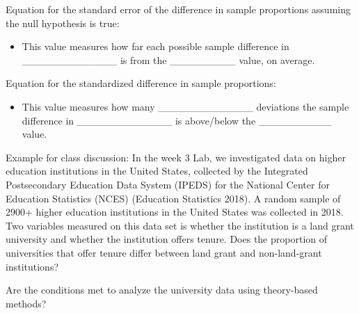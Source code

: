 \documentclass[
]{report}
\providecommand{\tightlist}{%
  \setlength{\itemsep}{0pt}\setlength{\parskip}{0pt}}
\begin{document}
Equation for the standard error of the difference in sample proportions assuming the null hypothesis is true:

\vspace{0.8in}


\begin{itemize}
\tightlist
\item
  This value measures how far each possible sample difference in \_\_\_\_\_\_\_\_\_\_\_\_\_ is from the \_\_\_\_\_\_\_\_\_ value, on average.
\end{itemize}


Equation for the standardized difference in sample proportions:

\vspace{0.8in}


\begin{itemize}
\tightlist
\item
  This value measures how many \_\_\_\_\_\_\_\_\_\_\_\_\_ deviations the sample difference in \_\_\_\_\_\_\_\_\_\_\_\_\_ is above/below the \_\_\_\_\_\_\_\_\_\_ value.
\end{itemize}


Example for class discussion: In the week 3 Lab, we investigated data on higher education institutions in the United States, collected by the Integrated Postsecondary Education Data System (IPEDS) for the National Center for Education Statistics (NCES) (Education Statistics 2018). A random sample of 2900+ higher education institutions in the United States was collected in 2018. Two variables measured on this data set is whether the institution is a land grant university and whether the institution offers tenure. Does the proportion of universities that offer tenure differ between land grant and non-land-grant institutions?

Are the conditions met to analyze the university data using theory-based methods?

\vspace{0.8in}
\end{document}

